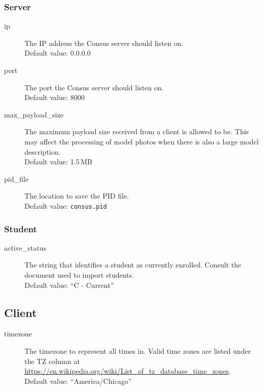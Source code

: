 \subsubsection{Server}
\label{subsubsec:server_config_server}

\begin{description}
  \item[ip] The IP address the Consus server should listen on.\\
    Default value: 0.0.0.0
  \item[port] The port the Consus server should listen on.\\
    Default value: 8000
  \item[max\_payload\_size] The maximum payload size received from a client is allowed to be.
    This may affect the processing of model photos when there is also a large model description.\\
    Default value: 1.5\,MB
  \item[pid\_file] The location to save the PID file.\\
    Default value: \texttt{consus.pid}
\end{description}

\subsubsection{Student}
\label{subsubsec:server_config_student}

\begin{description}
  \item[active\_status] The string that identifies a student as currently enrolled.
    Consult the document used to import students.\\
    Default value: ``C - Current''
\end{description}

\subsection{Client}
\label{subsec:client_config}

\begin{description}
  \item[timezone] The timezone to represent all times in.
    Valid time zones are listed under the TZ column at \url{https://en.wikipedia.org/wiki/List_of_tz_database_time_zones}.\\
    Default value: ``America/Chicago''
\end{description}

